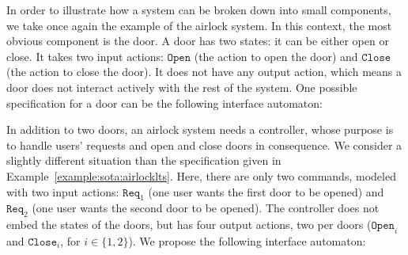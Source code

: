 \begin{example}
  \label{example:sota:airlockinterface}

  In order to illustrate how a system can be broken down into small components,
  we take once again the example of the airlock system.
  In this context, the most obvious component is the door.
  A door has two states: it can be either open or close.
  It takes two input actions: \( \mathtt{Open} \) (the action to open the door)
  and \( \mathtt{Close} \) (the action to close the door).
  It does not have any output action, which means a door does not interact
  actively with the rest of the system.
  One possible specification for a door can be the following interface
  automaton:

  \begin{center}
  \end{center}

  In addition to two doors, an airlock system needs a controller, whose purpose
  is to handle users' requests and open and close doors in consequence.
  We consider a slightly different situation than the specification given in
  Example~\ref{example:sota:airlocklts}.
  Here, there are only two commands, modeled with two input actions:
  \( \mathtt{Req}_1 \) (one user wants the first door to be opened) and
  \( \mathtt{Req}_2 \) (one user wants the second door to be opened).
  The controller does not embed the states of the doors, but has four output
  actions, two per doors (\( \mathtt{Open}_i \) and \( \mathtt{Close}_i\), for
  \( i \in \{1, 2\}\)).
  We propose the following interface automaton:


\end{example}
